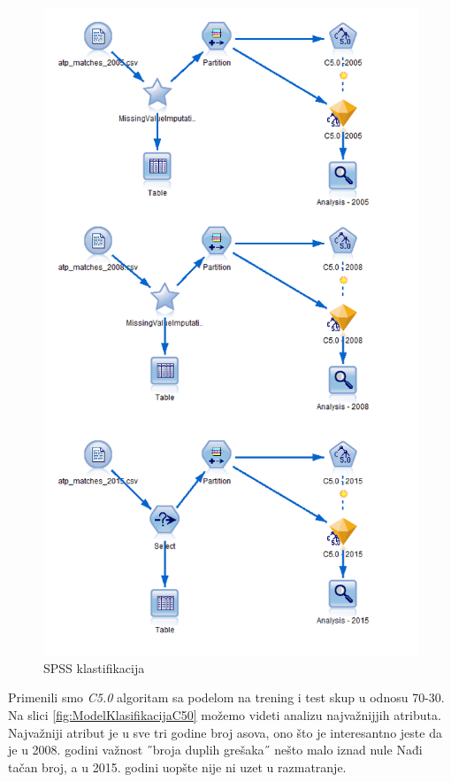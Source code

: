 \documentclass[a4paper]{article}
\begin{document}
\begin{figure}[H]
	\begin{center}
		\includegraphics[scale=0.60]{Klasifikacija/C50/SPSS_C50_Surface.png}
	\end{center}
	\caption{SPSS klastifikacija}
	\label{fig:SPSS_CvoroviKlasifikacija}
\end{figure}

Primenili smo \textit{C5.0} algoritam sa podelom na trening i test skup u odnosu 70-30. Na slici \ref{fig:ModelKlasifikacijaC50} možemo videti analizu najvažnijjih atributa. Najvažniji atribut je u sve tri godine broj asova, ono što je interesantno jeste da je u 2008. godini važnost ˝broja duplih grešaka˝ nešto malo iznad nule {\color{red}Nađi tačan broj}, a u 2015. godini uopšte nije ni uzet u razmatranje.
\end{document}
